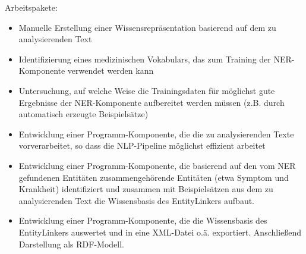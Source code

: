 Arbeitspakete:
\begin{itemize}
    \item Manuelle Erstellung einer Wissensrepräsentation basierend auf dem zu analysierenden Text
    \item Identifizierung eines medizinischen Vokabulars, das zum Training der NER-Komponente verwendet werden kann
    \item Untersuchung, auf welche Weise die Trainingsdaten für möglichst gute Ergebnisse der NER-Komponente aufbereitet werden müssen (z.B. durch automatisch erzeugte Beispielsätze)
    \item Entwicklung einer Programm-Komponente, die die zu analysierenden Texte vorverarbeitet, so dass die NLP-Pipeline möglichst effizient arbeitet
    \item Entwicklung einer Programm-Komponente, die basierend auf den vom NER gefundenen Entitäten zusammengehörende Entitäten (etwa Symptom und Krankheit) identifiziert und zusammen mit Beispielsätzen aus dem zu analysierenden Text die Wissensbasis des EntityLinkers aufbaut.
    \item Entwicklung einer Programm-Komponente, die die Wissensbasis des EntityLinkers auswertet und in eine XML-Datei o.ä. exportiert. Anschließend Darstellung als RDF-Modell.
\end{itemize}



